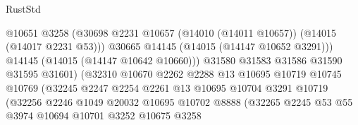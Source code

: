 \begin{lexlean}{RustStd}
\begin{coremodule}
                                          @10651
                                          @3258
                                          (@30698
                                            @2231
                                            @10657
                                            (@14010 (@14011 @10657))
                                            (@14015 (@14017 @2231 @53)))
                                          @30665
                                          @14145
                                          (@14015 (@14147 @10652 @3291)))
                                        @14145
                                        (@14015 (@14147 @10642 @10660)))
                                      @31580
                                      @31583
                                      @31586
                                      @31590
                                      @31595
                                      @31601)
                                    (@32310
                                      @10670
                                      @2262
                                      @2288
                                      @13
                                      @10695
                                      @10719
                                      @10745
                                      @10769
                                      (@32245
                                        @2247
                                        @2254
                                        @2261
                                        @13
                                        @10695
                                        @10704
                                        @3291
                                        @10719
                                        (@32256
                                          @2246
                                          @1049
                                          @20032
                                          @10695
                                          @10702
                                          @8888
                                          (@32265
                                            @2245
                                            @53
                                            @55
                                            @3974
                                            @10694
                                            @10701
                                            @3252
                                            @10675
                                            @3258

\end{coremodule}
\end{lexlean}
